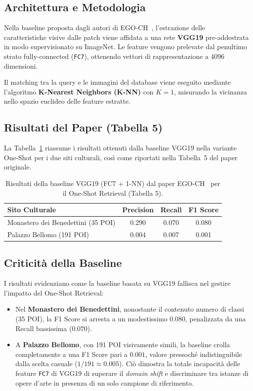 \documentclass[a4paper,12pt]{report}
\begin{document}
\subsection{Architettura e Metodologia}

Nella baseline proposta dagli autori di EGO-CH~\cite{egoref}, l'estrazione delle caratteristiche visive dalle patch viene affidata a una rete \textbf{VGG19} pre-addestrata in modo supervisionato su ImageNet. Le feature vengono prelevate dal penultimo strato fully-connected (\texttt{FC7}), ottenendo vettori di rappresentazione a 4096 dimensioni.

Il matching tra la query e le immagini del database viene eseguito mediante l'algoritmo \textbf{K-Nearest Neighbors (K-NN)} con $K=1$, misurando la vicinanza nello spazio euclideo delle feature estratte.

\subsection{Risultati del Paper (Tabella 5)}

La Tabella~\ref{tab:baseline_retrieval_paper} riassume i risultati ottenuti dalla baseline VGG19 nella variante One-Shot per i due siti culturali, così come riportati nella Tabella~5 del paper originale.

\begin{table}[htbp]
\centering
\caption{Risultati della baseline VGG19 (FC7 + 1-NN) dal paper EGO-CH~\cite{egoref} per il One-Shot Retrieval (Tabella 5).}
\label{tab:baseline_retrieval_paper}
\begin{tabular}{lccc}
\toprule
\textbf{Sito Culturale} & \textbf{Precision} & \textbf{Recall} & \textbf{F1 Score} \\
\midrule
Monastero dei Benedettini (35 POI) & 0.290 & 0.070 & 0.080 \\
Palazzo Bellomo (191 POI)          & 0.004 & 0.007 & 0.001 \\
\bottomrule
\end{tabular}
\end{table}

\subsection{Criticità della Baseline}

I risultati evidenziano come la baseline basata su VGG19 fallisca nel gestire l'impatto del One-Shot Retrieval:
\begin{itemize}
    \item Nel \textbf{Monastero dei Benedettini}, nonostante il contenuto numero di classi (35 POI), la F1 Score si arresta a un modestissimo $0.080$, penalizzata da una Recall bassissima ($0.070$).
    \item A \textbf{Palazzo Bellomo}, con 191 POI visivamente simili, la baseline crolla completamente a una F1 Score pari a $0.001$, valore pressoché indistinguibile dalla scelta casuale ($1/191 \approx 0.005$). Ciò dimostra la totale incapacità delle feature \texttt{FC7} di VGG19 di superare il \emph{domain shift} e discriminare tra istanze di opere d'arte in presenza di un solo campione di riferimento.
\end{itemize}
\end{document}
